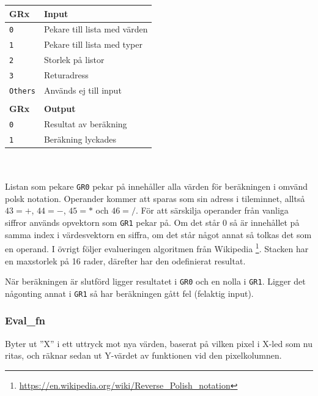 \documentclass[]{article}
\begin{document}
\begin{tabular}{ll}
	\textbf{GRx}    & \textbf{Input}               \\ \hline
	\texttt{0}      & Pekare till lista med värden \\
	\texttt{1}      & Pekare till lista med typer  \\
	\texttt{2}      & Storlek på listor            \\
	\texttt{3}      & Returadress                  \\
	\texttt{Others} & Används ej till input        \\
	                &  \\
	\textbf{GRx}    & \textbf{Output}              \\ \hline
	\texttt{0}      & Resultat av beräkning        \\
	\texttt{1}      & Beräkning lyckades
\end{tabular}
\\\\
\noindent
Listan som pekare \texttt{GR0} pekar på innehåller alla värden för beräkningen i omvänd polsk notation. Operander kommer att sparas som sin adress i tileminnet, alltså $43=+$, $44=-$, $45=*$ och $46=/$. För att särskilja operander från vanliga siffror används opvektorn som \texttt{GR1} pekar på. Om det står 0 så är innehållet på samma index i värdesvektorn en siffra, om det står något annat så tolkas det som en operand. I övrigt följer evalueringen algoritmen från Wikipedia \footnote{\href{https://en.wikipedia.org/wiki/Reverse_Polish_notation\#Postfix_algorithm}{\url{https://en.wikipedia.org/wiki/Reverse_Polish_notation}}}. Stacken har en maxstorlek på 16 rader, därefter har den odefinierat resultat. 

När beräkningen är slutförd ligger resultatet i \texttt{GR0} och en nolla i \texttt{GR1}. Ligger det någonting annat i \texttt{GR1} så har beräkningen gått fel (felaktig input).

\subsubsection{Eval\_fn}
\label{sec:evalfn}

Byter ut ''X'' i ett uttryck mot nya värden, baserat på vilken pixel i X-led som nu ritas, och räknar sedan ut Y-värdet av funktionen vid den pixelkolumnen.
\end{document}
